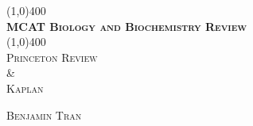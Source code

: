 \documentclass[10pt,letterpaper]{report}
\makeatletter
\let\org@subfile
\renewcommand*{}[1]{%
  \filename@parse{#1}%
  \expandafter
  \graphicspath\expandafter{\expandafter{\filename@area/images/}}%
  \org@subfile{#1}%
}
\makeatother
\begin{document}
\begin{titlepage}
	\begin{center}
		\line(1,0){400}\\
		[0.25in]
		\huge{\bfseries \textsc{MCAT Biology and Biochemistry Review}}\\
		[0.10in]
		\line(1,0){400}\\
		\textsc{Princeton Review}\\
		\& \\
		\textsc{Kaplan\supdag}\\
		[10cm]
	\end{center}
	
	\begin{flushright}
		\textsc{Benjamin Tran}
	\end{flushright}
\end{titlepage}
	
	\tableofcontents
	\thispagestyle{empty}
	\clearpage

	\setcounter{chapter}{1}

	
	
	
	
	
        
        
        
        
        
        
	
	\clearpage
	\printindex
\end{document}
